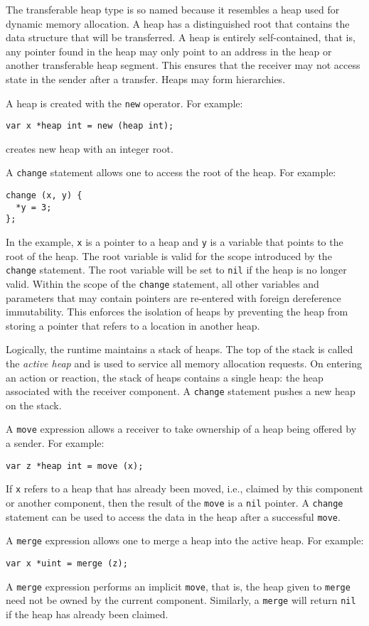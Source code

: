 The transferable heap type is so named because it resembles a heap used for dynamic memory allocation.
A heap has a distinguished root that contains the data structure that will be transferred.
A heap is entirely self-contained, that is, any pointer found in the heap may only point to an address in the heap or another transferable heap segment.
This ensures that the receiver may not access state in the sender after a transfer.
Heaps may form hierarchies.

A heap is created with the \verb+new+ operator.
For example:
\begin{verbatim}
var x *heap int = new (heap int);
\end{verbatim}
creates new heap with an integer root.

A \verb+change+ statement allows one to access the root of the heap.
For example:
\begin{verbatim}
change (x, y) {
  *y = 3;
};
\end{verbatim}
In the example, \verb+x+ is a pointer to a heap and \verb+y+ is a variable that points to the root of the heap.
The root variable is valid for the scope introduced by the \verb+change+ statement.
The root variable will be set to \verb+nil+ if the heap is no longer valid.
Within the scope of the \verb+change+ statement, all other variables and parameters that may contain pointers are re-entered with foreign dereference immutability.
This enforces the isolation of heaps by preventing the heap from storing a pointer that refers to a location in another heap.

Logically, the runtime maintains a stack of heaps.
The top of the stack is called the \emph{active heap} and is used to service all memory allocation requests.
On entering an action or reaction, the stack of heaps contains a single heap:  the heap associated with the receiver component.
A \verb+change+ statement pushes a new heap on the stack.

A \verb+move+ expression allows a receiver to take ownership of a heap being offered by a sender.
For example:
\begin{verbatim}
var z *heap int = move (x);
\end{verbatim}
If \verb+x+ refers to a heap that has already been moved, i.e., claimed by this component or another component, then the result of the \verb+move+ is a \verb+nil+ pointer.
A \verb+change+ statement can be used to access the data in the heap after a successful \verb+move+.

A \verb+merge+ expression allows one to merge a heap into the active heap.
For example:
\begin{verbatim}
var x *uint = merge (z);
\end{verbatim}
A \verb+merge+ expression performs an implicit \verb+move+, that is, the heap given to \verb+merge+ need not be owned by the current component.
Similarly, a \verb+merge+ will return \verb+nil+ if the heap has already been claimed.

